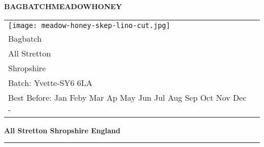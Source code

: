 \documentclass[10pt, a4paper]{letter}
\newcommand{\MONTH}{%
  \ifcase\the\month
  \or Jan%
  \or Feby%
  \or Mar%
  \or Ap%
  \or May%
  \or Jun%
  \or Jul%
  \or Aug%
  \or Sep%
  \or Oct%
  \or Nov%
  \or Dec%
  \fi}
\begin{document}

\newcommand\honeylabel{%
{\fontsize{15pt}{20pt}\selectfont  \textbf{BAGBATCH\hfil MEADOW\hfil HONEY}} 
  \begin{tabular}{ll}%
    \begin{minipage}{2cm}%
      \smallskip
      \texttt{[image: meadow-honey-skep-lino-cut.jpg]}
    \end{minipage}%
    \vspace*{2pt}
    &
    \begin{minipage}{4.5cm}
     \par
      454g 1lb \hfill Joe Collins\\
      \footnotesize\strut\hfill Bagbatch\\
      \strut\hfill All Stretton\\
      \strut\hfill  Shropshire\\
      Batch: Yvette-\the\month \hfill SY6 6LA\\
      \AdvanceDate[365]%
      Best Before: \MONTH-\the\year{} \hfill\strut 
    \end{minipage}
  \end{tabular}
{\fontsize{14pt}{20pt}\selectfont  \textbf{All Stretton \hfil Shropshire \hfil England}}
}%

\begin{labels}
%
{%
  \honeylabel
  
}%
\end{labels}

\LeftPageMargin=0mm
\LabelSetup
\setlength{\parskip}{1em}
%
{%
  \rule{\paperwidth}{3pt}\par\par
}%
\end{document}

